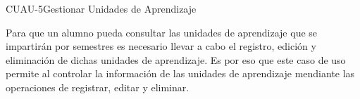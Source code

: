 \begin{UseCase}{CUAU-5}{Gestionar Unidades de Aprendizaje}
	{
		Para que un alumno pueda consultar las unidades de aprendizaje que se impartirán por semestres es necesario llevar a cabo el registro, edición y eliminación de dichas unidades de aprendizaje. Es por eso que este caso de uso permite al  controlar la información de las unidades de aprendizaje mendiante las operaciones de registrar, editar y eliminar.
			
		}
		
		
		

\end{UseCase}
